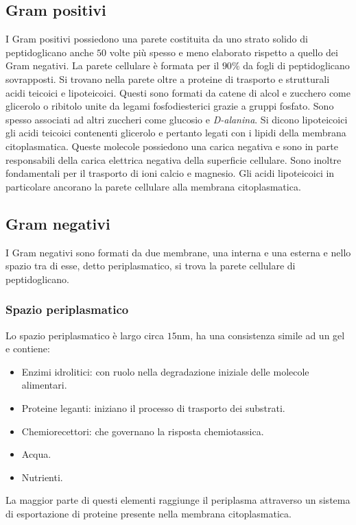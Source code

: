 \subsection{Gram positivi} 
I Gram positivi possiedono una parete costituita da uno strato solido di peptidoglicano anche $50$ volte pi\`u spesso e meno elaborato rispetto a quello dei Gram negativi. La
parete cellulare \`e formata per il $90\%$ da fogli di peptidoglicano sovrapposti. Si trovano nella parete oltre a proteine di trasporto e strutturali acidi teicoici e lipoteicoici. 
Questi sono formati da catene di alcol e zucchero come glicerolo o ribitolo unite da legami fosfodiesterici grazie a gruppi fosfato. Sono spesso associati ad altri zuccheri come
glucosio e \emph{D-alanina}. Si dicono lipoteicoici gli acidi teicoici contenenti glicerolo e pertanto legati con i lipidi della membrana citoplasmatica. Queste molecole possiedono una
carica negativa e sono in parte responsabili della carica elettrica negativa della superficie cellulare. Sono inoltre fondamentali per il trasporto di ioni calcio e magnesio. Gli
acidi lipoteicoici in particolare ancorano la parete cellulare alla membrana citoplasmatica. 
\subsection{Gram negativi}
I Gram negativi sono formati da due membrane, una interna e una esterna e nello spazio tra di esse, detto periplasmatico, si trova la parete cellulare di peptidoglicano. 
\subsubsection{Spazio periplasmatico}
Lo spazio periplasmatico \`e largo circa $15\si{\nano\metre}$, ha una consistenza simile ad un gel e contiene:
\begin{itemize}
	\item Enzimi idrolitici: con ruolo nella degradazione iniziale delle molecole alimentari.
	\item Proteine leganti: iniziano il processo di trasporto dei substrati.
	\item Chemiorecettori: che governano la risposta chemiotassica.
	\item Acqua.
	\item Nutrienti.
\end{itemize}
La maggior parte di questi elementi raggiunge il periplasma attraverso un sistema di esportazione di proteine presente nella membrana citoplasmatica. 
